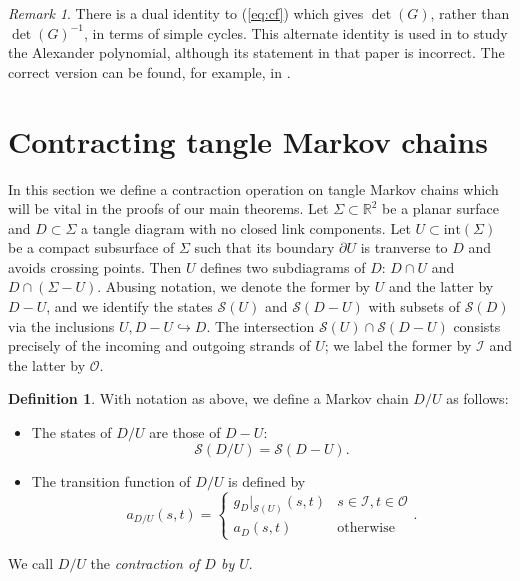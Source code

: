 \documentclass[11pt,hyp,]{nyjm}
\newcommand{\R}{\mathbb{R}}
\numberwithin{thm}{section}
\theoremstyle{definition}
\newtheorem{defn}[thm]{Definition}
\theoremstyle{remark}
\newtheorem{rmk}[thm]{Remark}
\begin{document}
	\begin{rmk}
		There is a dual identity to (\ref{eq:cf}) which gives $\det(G)$, rather than $\det(G)^{-1}$, in terms of simple cycles. This alternate identity is used in \cite[Theorem 4.3]{lw01} to study the Alexander polynomial, although its statement in that paper is incorrect. The correct version can be found, for example, in \cite[Section 2.3]{giro17}.
	\end{rmk}
		
	\section{Contracting tangle Markov chains}
	\label{sec:cmc}
	
	In this section we define a contraction operation on tangle Markov chains which will be vital in the proofs of our main theorems. Let $\Sigma \subset \R^2$ be a planar surface and $D \subset \Sigma$ a tangle diagram with no closed link components. Let $U \subset \text{int}(\Sigma)$ be a compact subsurface of $\Sigma$ such that its boundary $\partial U$ is tranverse to $D$ and avoids crossing points. Then $U$ defines two subdiagrams of $D$: $D \cap U$ and $D \cap (\Sigma - U)$. Abusing notation, we denote the former by $U$ and the latter by $D - U$, and we identify the states $\mathcal{S}(U)$ and $\mathcal{S}(D - U)$ with subsets of $\mathcal{S}(D)$ via the inclusions $U, D - U \hookrightarrow D$. The intersection $\mathcal{S}(U) \cap \mathcal{S}(D - U)$ consists precisely of the incoming and outgoing strands of $U$; we label the former by $\mathcal{I}$ and the latter by $\mathcal{O}$.
	
	\begin{defn}
		\label{def:cmc}
		With notation as above, we define a Markov chain $D/U$ as follows:
		\begin{itemize}
			\item The states of $D/U$ are those of $D - U$: 
			$$
				\mathcal{S}(D/U) = \mathcal{S}(D - U).
			$$
			\item The transition function of $D/U$ is defined by
			$$
			a_{D/U}(s,t) = \begin{cases}
				g_D|_{\mathcal{S}(U)}(s,t) & s \in \mathcal{I}, t \in \mathcal{O} \\
				a_D(s,t) & \text{otherwise}
			\end{cases}.
			$$
			
		\end{itemize}
		We call $D/U$ the {\em contraction of $D$ by $U$}.
	\end{defn}
\end{document}
